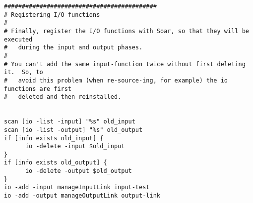 \begin{verbatim}
###########################################
# Registering I/O functions
#
# Finally, register the I/O functions with Soar, so that they will be executed
#   during the input and output phases.
#
# You can't add the same input-function twice without first deleting it.  So, to
#   avoid this problem (when re-source-ing, for example) the io functions are first
#   deleted and then reinstalled.
 

scan [io -list -input] "%s" old_input
scan [io -list -output] "%s" old_output
if [info exists old_input] {
      io -delete -input $old_input
}
if [info exists old_output] {
      io -delete -output $old_output
}
io -add -input manageInputLink input-test
io -add -output manageOutputLink output-link

 

 \end{verbatim}